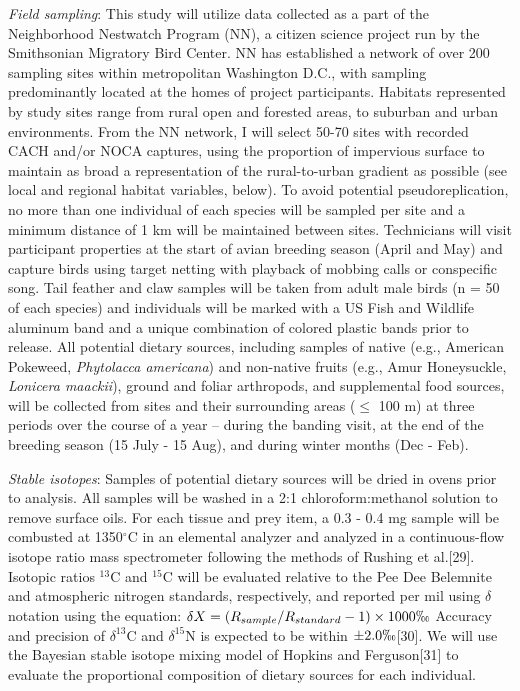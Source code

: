 \documentclass[12pt]{article}
\begin{document}
\noindent \textit {Field sampling}: This study will utilize data collected as a part of the Neighborhood Nestwatch Program (NN), a citizen science project run by the Smithsonian Migratory Bird Center. NN has established a network of over 200 sampling sites within metropolitan Washington D.C., with sampling predominantly located at the homes of project participants. Habitats represented by study sites range from rural open and forested areas, to suburban and urban environments. From the NN network, I will select 50-70 sites with recorded CACH and/or NOCA captures, using the proportion of impervious surface to maintain as broad a representation of the rural-to-urban gradient as possible (see local and regional habitat variables, below). To avoid potential pseudoreplication, no more than one individual of each species will be sampled per site and a minimum distance of 1 km will be maintained between sites. Technicians will visit participant properties at the start of avian breeding season (April and May) and capture birds using target netting with playback of mobbing calls or conspecific song. Tail feather and claw samples will be taken from adult male birds (n = 50 of each species) and individuals will be marked with a US Fish and Wildlife aluminum band and a unique combination of colored plastic bands prior to release. All potential dietary sources, including samples of native  (e.g., American  Pokeweed, \textit {Phytolacca americana}) and non-native fruits (e.g., Amur Honeysuckle, \textit {Lonicera maackii}), ground and foliar arthropods, and supplemental food sources, will be collected from sites and their surrounding areas ($\leq$ 100 m) at three periods over the course of a year -- during the banding visit, at the end of the breeding season (15 July - 15 Aug), and during winter months (Dec - Feb).\par

\noindent \textit{Stable isotopes}: Samples of potential dietary sources will be dried in ovens prior to analysis. All samples will be washed in a 2:1 chloroform:methanol solution to remove surface oils. For each tissue and prey item, a 0.3 - 0.4 mg sample will be combusted at 1350$^{\circ}$C in an elemental analyzer and analyzed in a continuous-flow isotope ratio mass spectrometer following the methods of Rushing et al.[29]. Isotopic ratios $^{13}$C and $^{15}$C will be evaluated relative to the Pee Dee Belemnite and atmospheric nitrogen standards, respectively, and reported per mil using $\delta$ notation using the equation: $\delta{X} = (R_{sample}/R_{standard} -1) \times 1000\permil$
\noindent Accuracy and precision of $\delta^{13}$C and $\delta^{15}$N is expected to be within $\pm 2.0 \permil$[30]. We will use the Bayesian stable isotope mixing model of Hopkins and Ferguson[31] to evaluate the proportional composition of dietary sources for each individual. \par
\end{document}
